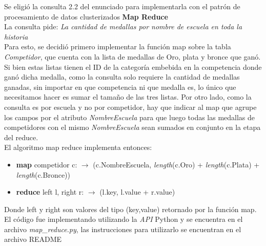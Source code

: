 Se eligió la consulta 2.2 del enunciado para implementarla con el patrón de procesamiento de datos clusterizados \textbf{Map Reduce} \\

La consulta pide: \textit{La cantidad de medallas por nombre de escuela en toda la historia} \\

Para esto, se decidió primero implementar la función map sobre la tabla \textit{Competidor}, que cuenta con la lista de medallas de Oro, plata y bronce que ganó. Si bien estas listas tienen el ID de la categoría embebida en la competencia donde ganó dicha medalla, como la consulta solo requiere la cantidad de medallas ganadas, sin importar en que competencia ni que medalla es, lo único que necesitamos hacer es sumar el tamaño de las tres listas. Por otro lado, como la consulta es por escuela y no por competidor, hay que indicar al map que agrupe los campos por el atributo \textit{NombreEscuela} para que luego todas las medallas de competidores con el mismo \textit{NombreEscuela} sean sumados en conjunto en la etapa del reduce. \\ 

El algoritmo map reduce implementa entonces:
\begin{itemize}
\item \textbf{map} competidor c: $\rightarrow$ (c.NombreEscuela, \textit{length}(c.Oro) + \textit{length}(c.Plata) + \textit{length}(c.Bronce))
\item \textbf{reduce} left l, right r: $\rightarrow$ (l.key, l.value + r.value)
\end{itemize}
Donde left y right son valores del tipo (key,value) retornado por la función map. \\

El código fue implementando utilizando la \textit{API} Python y se encuentra en el archivo \textit{map_reduce.py}, las instrucciones para utilizarlo se encuentran en el archivo README